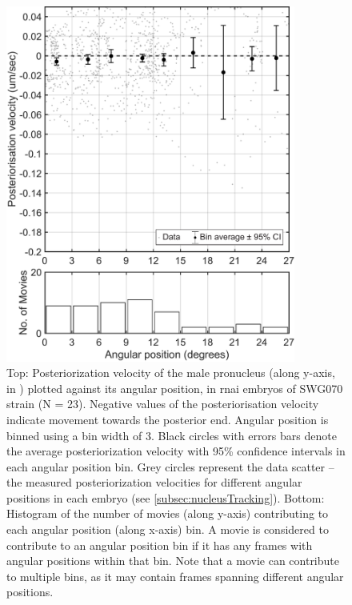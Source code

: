\begin{figure}
\centering
\includegraphics[width=0.85\textwidth]{Results/FigExpAir1/air1PostVelVsAngle.pdf}
\caption[Experimentally observed posteriorisation velocity of the male pronucleus in  \acs{rnai} embryos]{Top: Posteriorization velocity of the male pronucleus (along y-axis, in \si{\unitPostVel}) plotted against its angular position, in  \ac{rnai} embryos of SWG070 strain (N = 23). Negative values of the posteriorisation velocity indicate movement towards the posterior end. Angular position is binned using a bin width of \SI{3}{\unitAngle}. Black circles with errors bars denote the average posteriorization velocity with \num{95}\% confidence intervals in each angular position bin. Grey circles represent the data scatter -- the measured posteriorization velocities for different angular positions in each embryo (see \autoref{subsec:nucleusTracking}). Bottom: Histogram of the number of movies (along y-axis) contributing to each angular position (along x-axis) bin. A movie is considered to contribute to an angular position bin if it has any frames with angular positions within that bin. Note that a movie can contribute to multiple bins, as it may contain frames spanning different angular positions.}
\label{fig:swg070Air1PostVelVsAngle}
\end{figure}

